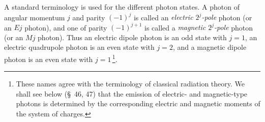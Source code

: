 A standard terminology is used for the different photon states. A photon of angular momentum $j$ and parity $(-1)^j$ is called an \emph{electric $2^j$-pole} photon (or an $Ej$ photon), and one of parity $(-1)^{j+1}$ is called a \emph{magnetic $2^j$-pole} photon (or an $Mj$ photon). Thus an electric dipole photon is an odd state with $j = 1$, an electric quadrupole photon is an even state with $j = 2$, and a magnetic dipole photon is an even state with $j = 1$\,\footnote{These names agree with the terminology of classical radiation theory. We shall see below (\S~46, 47) that the emission of electric- and magnetic-type photons is determined by the corresponding electric and magnetic moments of the system of charges.}.
